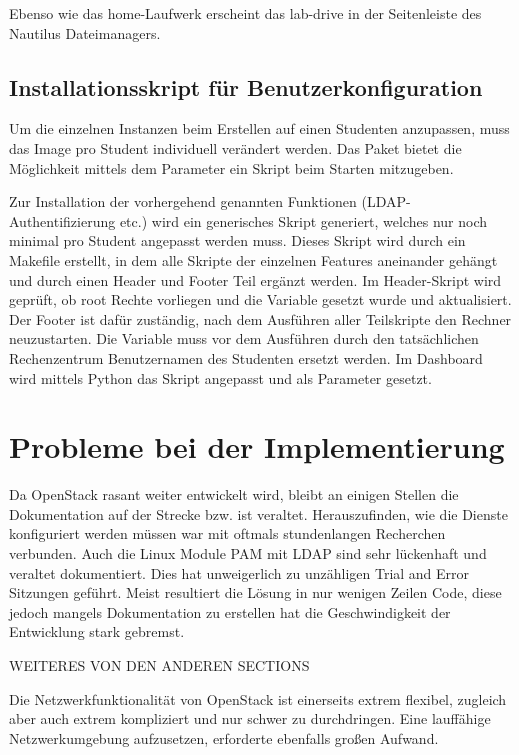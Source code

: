 Ebenso wie das home-Laufwerk erscheint das lab-drive in der Seitenleiste des Nautilus Dateimanagers.

\subsection{Installationsskript  für Benutzerkonfiguration}

Um die einzelnen Instanzen beim Erstellen auf einen Studenten anzupassen, muss das Image pro Student individuell verändert werden. 
Das  Paket bietet die Möglichkeit mittels dem Parameter  ein Skript beim Starten mitzugeben. 

Zur Installation der vorhergehend genannten Funktionen (LDAP-Authentifizierung etc.) wird ein generisches Skript generiert, welches nur noch minimal pro Student angepasst werden muss.
Dieses Skript  wird durch ein Makefile erstellt, in dem alle  Skripte der einzelnen Features aneinander gehängt und durch einen Header und Footer Teil ergänzt werden.
Im Header-Skript wird geprüft, ob root Rechte vorliegen und die  Variable gesetzt wurde und  aktualisiert. 
Der Footer ist dafür zuständig, nach dem Ausführen aller Teilskripte den Rechner neuzustarten.
Die  Variable muss vor dem Ausführen durch den tatsächlichen Rechenzentrum Benutzernamen des Studenten ersetzt werden.
Im Dashboard wird mittels Python das Skript angepasst und als  Parameter gesetzt.

\section{Probleme bei der Implementierung}

Da OpenStack rasant weiter entwickelt wird, bleibt an einigen Stellen die Dokumentation auf der Strecke bzw. ist veraltet. 
Herauszufinden, wie die Dienste konfiguriert werden müssen war mit oftmals stundenlangen Recherchen verbunden.
Auch die Linux Module PAM mit LDAP sind sehr lückenhaft und veraltet dokumentiert.
Dies hat unweigerlich zu unzähligen Trial and Error Sitzungen geführt.
Meist resultiert die Lösung in nur wenigen Zeilen Code, diese jedoch mangels Dokumentation zu erstellen hat die Geschwindigkeit der Entwicklung stark gebremst.



WEITERES VON DEN ANDEREN SECTIONS


Die Netzwerkfunktionalität von OpenStack ist einerseits extrem flexibel, zugleich aber auch extrem kompliziert und nur schwer zu durchdringen.
Eine lauffähige Netzwerkumgebung aufzusetzen, erforderte ebenfalls großen Aufwand.

